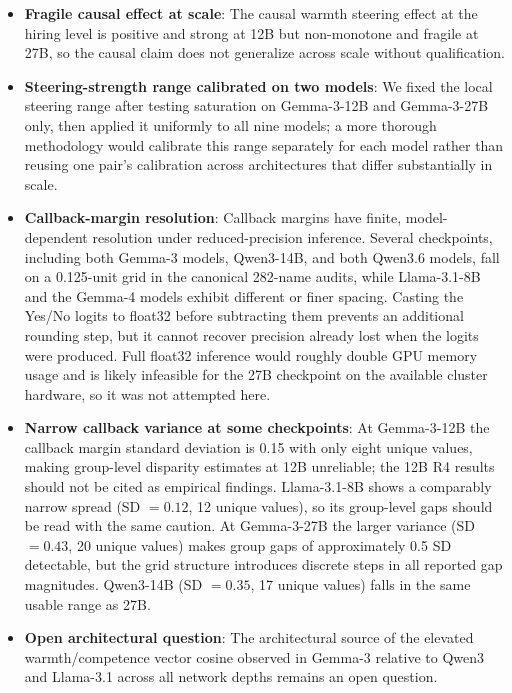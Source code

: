 \documentclass[twocolumn]{article}
\begin{document}
\begin{appendices}
\begin{itemize}[leftmargin=*, itemsep=2pt, topsep=4pt, parsep=0pt]
  \item \textbf{Fragile causal effect at scale}: The causal warmth
  steering effect at the hiring level is positive and strong at 12B but
  non-monotone and fragile at 27B, so the causal claim does not generalize
  across scale without qualification.
  \item \textbf{Steering-strength range calibrated on two models}: We
  fixed the local steering range after testing saturation on Gemma-3-12B
  and Gemma-3-27B only, then applied it uniformly to all nine models; a
  more thorough methodology would calibrate this range separately for
  each model rather than reusing one pair's calibration across
  architectures that differ substantially in scale.
  \item \textbf{Callback-margin resolution}: Callback margins have finite,
  model-dependent resolution under reduced-precision inference. Several
  checkpoints, including both Gemma-3 models, Qwen3-14B, and both Qwen3.6
  models, fall on a 0.125-unit grid in the canonical 282-name audits, while
  Llama-3.1-8B and the Gemma-4 models exhibit different or finer spacing.
  Casting the Yes/No logits to float32 before subtracting them prevents an
  additional rounding step, but it cannot recover precision already lost
  when the logits were produced. Full float32 inference would roughly
  double GPU memory usage and is likely infeasible for the 27B checkpoint
  on the available cluster hardware, so it was not attempted here.
  \item \textbf{Narrow callback variance at some checkpoints}: At
  Gemma-3-12B the callback margin standard deviation is 0.15 with only
  eight unique values, making group-level disparity estimates at 12B
  unreliable; the 12B R4 results should not be cited as empirical
  findings. Llama-3.1-8B shows a comparably narrow spread (SD $= 0.12$,
  12 unique values), so its group-level gaps should be read with the same
  caution. At Gemma-3-27B the larger variance (SD $= 0.43$, 20 unique
  values) makes group gaps of approximately 0.5 SD detectable, but the
  grid structure introduces discrete steps in all reported gap
  magnitudes. Qwen3-14B (SD $= 0.35$, 17 unique values) falls in the same
  usable range as 27B.
  \item \textbf{Open architectural question}: The architectural source of
  the elevated warmth/competence vector cosine observed in Gemma-3
  relative to Qwen3 and Llama-3.1 across all network depths remains an
  open question.
\end{itemize}


\end{appendices}
\end{document}
